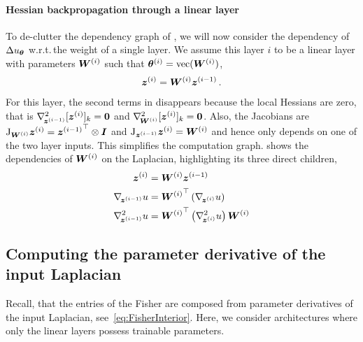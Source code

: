 \paragraph{Hessian backpropagation through a linear layer} To de-clutter the dependency graph of , we will now consider the dependency of $\Delta u_{{\bm{\theta}}}$ w.r.t.\,the weight of a single layer.
We assume this layer $i$ to be a linear layer with parameters ${\bm{W}}^{(i)}$ such that ${\bm{\theta}}^{(i)} = \operatorname{vec}({\bm{W}}^{(i)})$,
\begin{align}
  {\bm{z}}^{(i)} = {\bm{W}}^{(i)} {\bm{z}}^{(i-1)}\,.
\end{align}
For this layer, the second terms in  disappears because the local Hessians are zero, that is $\nabla_{\!{{\bm{z}}^{(i-1)}}}^{2}[{\bm{z}}^{(i)}]_k = {\bm{0}}$ and $\nabla_{\!{{\bm{W}}^{(i)}}}^{2}[{\bm{z}}^{(i)}]_k = {\bm{0}}$.
Also, the Jacobians are $\mathrm{J}_{{\bm{W}}^{(i)}}{\bm{z}}^{(i)} = {{\bm{z}}^{(i-1)}}^{\top} \otimes {\bm{I}}$ and $\mathrm{J}_{{\bm{z}}^{(i-1)}}{\bm{z}}^{(i)} = {\bm{W}}^{(i)}$ and hence only depends on one of the two layer inputs.
This simplifies the computation graph.
 shows the dependencies of ${\bm{W}}^{(i)}$ on the
Laplacian, highlighting its three direct children,
\begin{align}\label{eq:spatialDerivatives}
  \begin{split}
    {\bm{z}}^{(i)}
    &=
      {\bm{W}}^{(i)} {\bm{z}}^{(i-1)}
    \\
    \nabla_{\!{{\bm{z}}^{(i-1)}}}u
    &=
      {{\bm{W}}^{(i)}}^{\top}
      \left(
      \nabla_{\!{{\bm{z}}^{(i)}}}u
      \right)
    \\
    \nabla_{\!{{\bm{z}}^{(i-1)}}}^{2}u
    &=
      {{\bm{W}}^{(i)}}^{\top}
      \left(
      \nabla_{\!{{\bm{z}}^{(i)}}}^{2}u
      \right)
      {\bm{W}}^{(i)}
  \end{split}
\end{align}

\subsection{Computing the parameter derivative of the input Laplacian}
Recall, that the entries of the Fisher are composed from parameter derivatives of the input Laplacian, see~\eqref{eq:FisherInterior}.
Here, we consider architectures where only the linear layers possess trainable parameters. %

